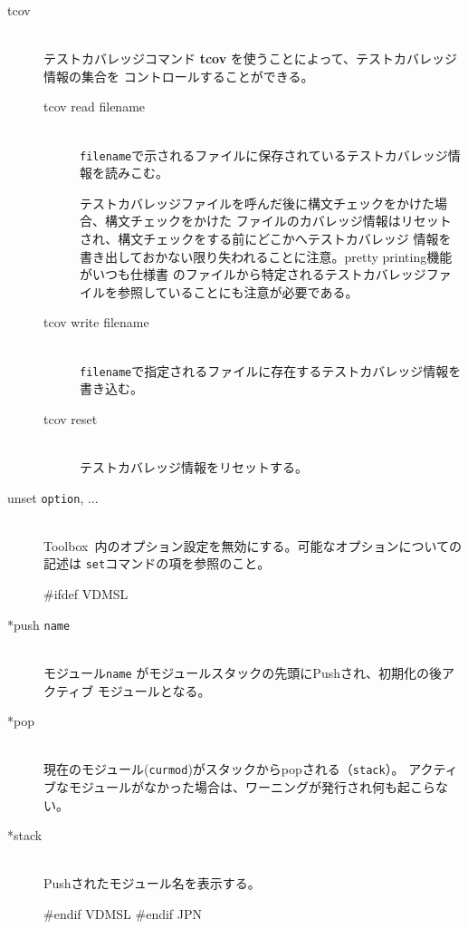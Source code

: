 \documentclass[\pformat,12pt]{article}
\newcommand{\Toolbox}{Toolbox}
\newcommand{\Toolbox}{Toolbox}
\begin{document}
\begin{description}
\item[tcov]\mbox{}\\
テストカバレッジコマンド {\bf tcov} を使うことによって、テストカバレッジ情報の集合を
コントロールすることができる。

  \begin{description}
  \item[tcov read filename]\mbox{}\\
    {\tt filename}で示されるファイルに保存されているテストカバレッジ情報を読みこむ。

    テストカバレッジファイルを呼んだ後に構文チェックをかけた場合、構文チェックをかけた
    ファイルのカバレッジ情報はリセットされ、構文チェックをする前にどこかへテストカバレッジ
    情報を書き出しておかない限り失われることに注意。pretty printing機能がいつも仕様書
    のファイルから特定されるテストカバレッジファイルを参照していることにも注意が必要である。

  \item[tcov write filename]\mbox{} \\
    {\tt filename}で指定されるファイルに存在するテストカバレッジ情報を書き込む。
  
  \item[tcov reset]\mbox{} \\
    テストカバレッジ情報をリセットする。
  \end{description}

  
\item[unset {\tt option}, ...]\mbox{}\\
  \Toolbox\ 内のオプション設定を無効にする。可能なオプションについての記述は
  {\tt set}コマンドの項を参照のこと。

#ifdef VDMSL
\item[*push {\tt name}] \mbox{}\\
  モジュール{\tt name} がモジュールスタックの先頭にPushされ、初期化の後アクティブ
  モジュールとなる。

\item[*pop] \mbox{}\\
 現在のモジュール({\tt curmod})がスタックからpopされる（{\tt stack}）。
 アクティブなモジュールがなかった場合は、ワーニングが発行され何も起こらない。

\item[*stack]\mbox{}\\
  Pushされたモジュール名を表示する。

#endif VDMSL
#endif JPN

\end{description}
\end{document}
